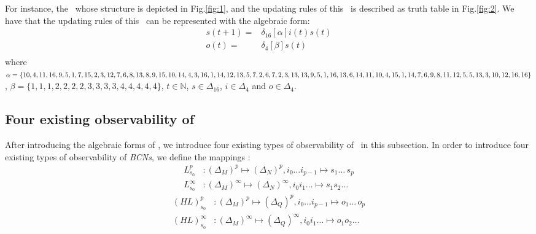\begin{example}
For instance, the \BCN\ whose structure is depicted in Fig.\ref{fig:1}, and the updating rules of this \BCN\ is described as truth table in Fig.\ref{fig:2}. We have that the updating rules of this \BCN\ can be represented with the algebraic form:
\begin{equation}
\begin{split}
s(t+1) =&\delta_{16}[\alpha]i(t)s(t)\\
o(t) =&\delta_4[\beta]s(t)\\
\end{split}
\label{equ:4}
\end{equation}
where $\alpha=\{10,4,11,16,9,5,1, 7,15,2,3,12,7,6,8,13,8,9,\\15,10,14,4,3,16,1,14,12,13,5,7,2,6,7,2,3,13,13,9,5,1,\\16,13 ,6,14,11,10,4,15,1,14 ,7,6,9 ,8,11,12,5,5,13,3,10,\\12,16,16\}$, $\beta=\{1,1,1,2,2,2,2,3,3,3,3,4,4,4,4,4\}$, $t\in \mathbb{N}$, $s\in \Delta_{16}$, $i\in \Delta_4$ and $o\in \Delta_4$.
\end{example}   
\subsection{Four existing observability of \BCNs}
After introducing the algebraic forms of \BCNs, we introduce four existing types of observability of \BCNs\ in this subsection. In order to introduce four existing types of observability of {\em BCNs}, we define the mappings \cite{Zhang2016Observability}:
\begin{equation}
\begin{split}
L^p_{s_0} &: (\Delta_M)^p\mapsto(\Delta_N)^p, i_0\ldots i_{p-1} \mapsto s_1 \ldots\, s_p\\
L^{\infty}_{s_0} &: (\Delta_M)^{\infty}\mapsto(\Delta_N)^{\infty}, i_0 i_1 \ldots  \mapsto s_1 s_2 \ldots
\end{split}
\label{equ:5}
\end{equation}
\begin{equation}
\begin{split}
(HL)^p_{s_0} &: (\Delta_M)^p\mapsto(\Delta_Q)^p, i_0\ldots i_{p-1} \mapsto o_1\ldots\, o_p\\
(HL)^{\infty}_{s_0} &: (\Delta_M)^{\infty}\mapsto(\Delta_Q)^{\infty}, i_0 i_1 \ldots  \mapsto o_1 o_2\ldots
\end{split}
\label{equ:6}
\end{equation}

